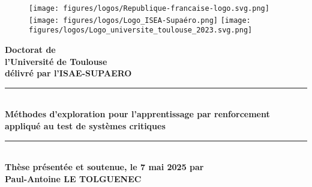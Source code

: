 \documentclass[a4paper,12pt]{article}
\begin{document}
\begin{figure}[!ht]
    \centering
    \texttt{[image: figures/logos/Republique-francaise-logo.svg.png]}  %
    \hspace{0.05\textwidth}  %
    \texttt{[image: figures/logos/Logo\_ISEA-Supaéro.png]}  %
    \hspace{0.05\textwidth}  %
    \texttt{[image: figures/logos/Logo\_universite\_toulouse\_2023.svg.png]}  %
\end{figure}

\begin{flushright}
    \textbf{\huge Doctorat de\\ l'Université de Toulouse} \\[0.5cm]
    \textbf{\large délivré par l'ISAE-SUPAERO} \\[2cm]
    
    \noindent\rule{8cm}{0.4pt}  %
    \\[0.5cm]
    \textbf{\large Méthodes d'exploration pour l'apprentissage par renforcement appliqué au test de systèmes critiques} \\[1.5cm]
    \noindent\rule{8cm}{0.4pt}  %
    \\[1.5cm]
    
    \textbf{\Large Thèse présentée et soutenue, le 7 mai 2025 par} \\[0.5cm]
    
    {\huge \textbf{Paul-Antoine LE TOLGUENEC}} \\[2cm]
\end{flushright}
\end{document}
